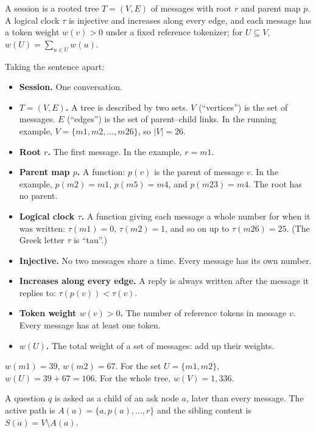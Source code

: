 \begin{paper}
A session is a rooted tree $T=(V,E)$ of messages with root $r$ and parent map $p$. A logical clock $\tau$ is injective and increases along every edge, and each message has a token weight $w(v)>0$ under a fixed reference tokenizer; for $U\subseteq V$, $w(U)=\sum_{u\in U}w(u)$.
\end{paper}

Taking the sentence apart:

\begin{itemize}
\item \textbf{Session.} One conversation.
\item \textbf{$T = (V, E)$.} A tree is described by two sets. $V$ (``vertices'') is the set of messages. $E$ (``edges'') is the set of parent--child links. In the running example, $V = \{m1, m2, \dots, m26\}$, so $|V| = 26$.
\item \textbf{Root $r$.} The first message. In the example, $r = m1$.
\item \textbf{Parent map $p$.} A function: $p(v)$ is the parent of message $v$. In the example, $p(m2) = m1$, $p(m5) = m4$, and $p(m23) = m4$. The root has no parent.
\item \textbf{Logical clock $\tau$.} A function giving each message a whole number for when it was written: $\tau(m1) = 0$, $\tau(m2) = 1$, and so on up to $\tau(m26) = 25$. (The Greek letter $\tau$ is ``tau''.)
\item \textbf{Injective.} No two messages share a time. Every message has its own number.
\item \textbf{Increases along every edge.} A reply is always written after the message it replies to: $\tau(p(v)) < \tau(v)$.
\item \textbf{Token weight $w(v) > 0$.} The number of reference tokens in message $v$. Every message has at least one token.
\item \textbf{$w(U)$.} The total weight of a set of messages: add up their weights.
\end{itemize}

\begin{example}
$w(m1) = 39$, $w(m2) = 67$. For the set $U = \{m1, m2\}$, $w(U) = 39 + 67 = 106$. For the whole tree, $w(V) = 1{,}336$.
\end{example}

\begin{paper}
A question $q$ is asked as a child of an ask node $a$, later than every message. The active path is $A(a)=\{a,p(a),\dots,r\}$ and the sibling content is $S(a)=V\setminus A(a)$.
\end{paper}

